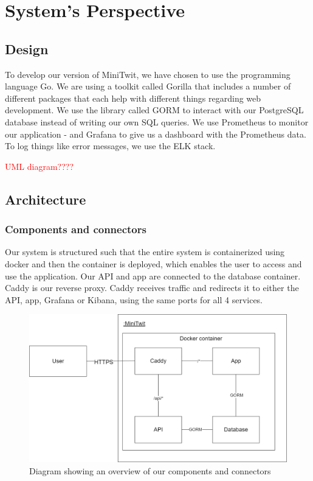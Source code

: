 \section{System's Perspective}

\subsection{Design}

To develop our version of MiniTwit, we have chosen to use the programming language Go. We are using a toolkit called Gorilla that includes a number of different packages that each help with different things regarding web development. We use the library called GORM to interact with our PostgreSQL database instead of writing our own SQL queries. We use Prometheus to monitor our application - and Grafana to give us a dashboard with the Prometheus data. To log things like error messages, we use the ELK stack.

\textcolor{red}{UML diagram????}





\subsection{Architecture}

\subsubsection{Components and connectors}
Our system is structured such that the entire system is containerized using docker and then the container is deployed, which enables the user to access and use the application.
Our API and app are connected to the database container. Caddy is our reverse proxy. Caddy receives traffic and redirects it to either the API, app, Grafana or Kibana, using the same ports for all 4 services.
    
\begin{figure}[H]
    \centering
    \includegraphics[scale=0.24]{images/C&C_diagram.png}
    \caption{Diagram showing an overview of our components and connectors}
    \label{fig:CCDiagram}
\end{figure}

